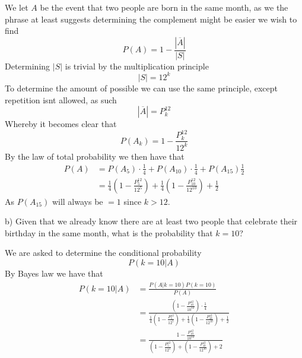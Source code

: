 We let $A$ be the event that two people are born in the same month, as we the phrase at least suggests determining the complement might be easier we wish to find
\[
    P(A)=1-\frac{|\overline{A}|}{|S|}
\]
Determining $|S|$ is trivial by the multiplication principle
\[
    |S|=12^{k}
\]
To determine the amount of possible we can use the same principle, except repetition isnt allowed, as such
\[
    |\overline{A}|=P_{k}^{12}
\]
Whereby it becomes clear that
\[
    P(A_{k})=1-\frac{P_{k}^{12}}{12^{k}}
\]
By the law of total probability we then have that
\begin{align*}
    P(A)&=P(A_{5})\cdot\frac{1}{4}+P(A_{10})\cdot\frac{1}{4}+P(A_{15})\frac{1}{2} \\
        &=\frac{1}{4}\left(1-\frac{P_{5}^{12}}{12^{5}}\right)+\frac{1}{4}\left(1-\frac{P_{10}^{12}}{12^{10}}\right)+\frac{1}{2}
\end{align*}
As $P(A_{15})$ will always be $=1$ since $k>12$.

b) Given that we already know there are at least two people that celebrate their birthday in the same month, what is the probability that $k=10$?

We are asked to determine the conditional probability
\[
    P(k=10|A)
\]
By Bayes law we have that
\begin{align*}
    P(k=10|A)&=\frac{P(A|k=10)P(k=10)}{P(A)} \\
             &=\frac{\left(1-\frac{P_{10}^{12}}{10^{12}}\right)\cdot\frac{1}{4}}{\frac{1}{4}\left(1-\frac{P_{5}^{12}}{12^{5}}\right)+\frac{1}{4}\left(1-\frac{P_{10}^{12}}{12^{10}}\right)+\frac{1}{2}} \\
             &=\frac{1-\frac{P_{10}^{12}}{10^{12}}}{\left(1-\frac{P_{5}^{12}}{12^{5}}\right)+\left(1-\frac{P_{10}^{12}}{12^{10}}\right)+2}
\end{align*}

